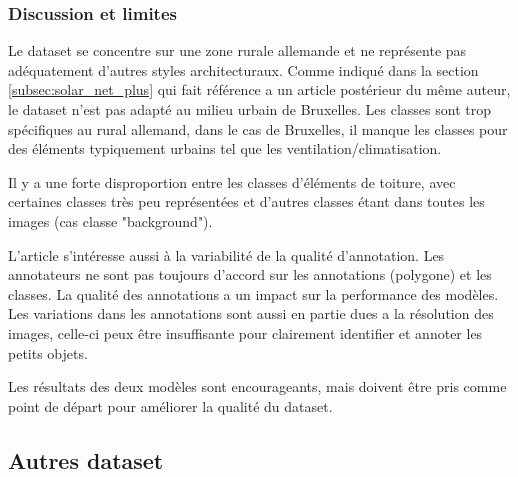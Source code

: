 \subsubsection{Discussion et limites}
\par{Le dataset se concentre sur une zone rurale allemande et ne représente pas adéquatement d'autres styles architecturaux. Comme indiqué dans la section \ref{subsec:solar_net_plus} qui fait référence a un article postérieur du même auteur, le dataset n'est pas adapté au milieu urbain de Bruxelles. Les classes sont trop spécifiques au rural allemand, dans le cas de Bruxelles, il manque les classes pour des éléments typiquement urbains tel que les ventilation/climatisation.}
\par{Il y a une forte disproportion entre les classes d'éléments de toiture, avec certaines classes très peu représentées et d'autres classes étant dans toutes les images (cas classe "background").}
\par{L'article s'intéresse aussi à la variabilité de la qualité d'annotation. Les annotateurs ne sont pas toujours d'accord sur les annotations (polygone) et les classes. La qualité des annotations a un impact sur la performance des modèles. Les variations dans les annotations sont aussi en partie dues a la résolution des images, celle-ci peux être insuffisante pour clairement identifier et annoter les petits objets.}
\par{Les résultats des deux modèles sont encourageants, mais doivent être pris comme point de départ pour améliorer la qualité du dataset.}

\subsection{Autres dataset}

